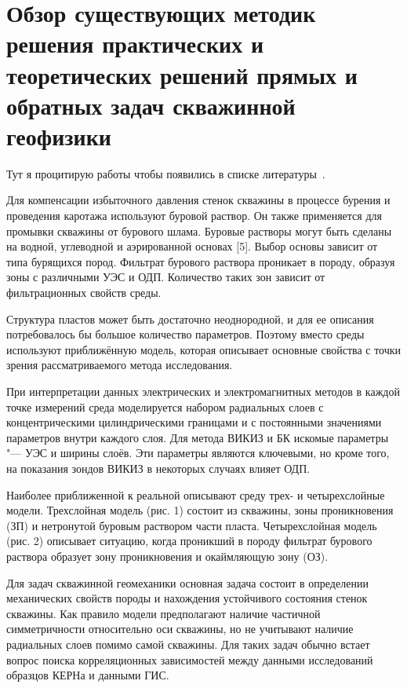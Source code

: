 \chapter{Обзор существующих методик решения практических и теоретических решений прямых и обратных задач скважинной геофизики} \label{chapt1}

Тут я процитирую работы чтобы появились в списке литературы~\cite{Serdyuk2011,Serdyuk2014,Serdyuk2017,Baranova2014,Koshelev2012,Serdyuk2013a,Teit2011,Uramaev2015}.

Для компенсации избыточного давления стенок скважины в процессе бурения и
проведения каротажа используют буровой раствор. Он также применяется для
промывки скважины от бурового шлама. Буровые растворы могут быть сделаны на
водной, углеводной и аэрированной основах [5]. Выбор основы зависит от типа
бурящихся пород. Фильтрат бурового раствора проникает в породу, образуя
зоны с различными УЭС и ОДП. Количество таких зон зависит от фильтрационных
свойств среды.

Структура пластов может быть достаточно неоднородной, и для ее описания
потребовалось бы большое количество параметров. Поэтому вместо среды
используют приближённую модель, которая описывает основные свойства с точки
зрения рассматриваемого метода исследования.

При интерпретации данных электрических и электромагнитных методов в каждой
точке измерений среда моделируется набором радиальных слоев с
концентрическими цилиндрическими границами и с постоянными значениями
параметров внутри каждого слоя. Для метода ВИКИЗ и БК искомые параметры
"--- УЭС и ширины слоёв. Эти параметры являются ключевыми, но кроме того,
на показания зондов ВИКИЗ в некоторых случаях влияет ОДП.

Наиболее приближенной к реальной описывают среду трех- и четырехслойные
модели.  Трехслойная модель (рис. 1) состоит из скважины, зоны
проникновения (ЗП) и нетронутой буровым раствором части пласта.
Четырехслойная модель (рис. 2) описывает ситуацию, когда проникший в породу
фильтрат бурового раствора образует зону проникновения и окаймляющую зону
(ОЗ).

Для задач скважинной геомеханики основная задача состоит в определении
механических свойств породы и нахождения устойчивого состояния стенок
скважины. Как правило модели предполагают наличие частичной симметричности
относительно оси скважины, но не учитывают наличие радиальных слоев помимо
самой скважины. Для таких задач обычно встает вопрос поиска корреляционных
зависимостей между данными исследований образцов КЕРНа и данными ГИС.

